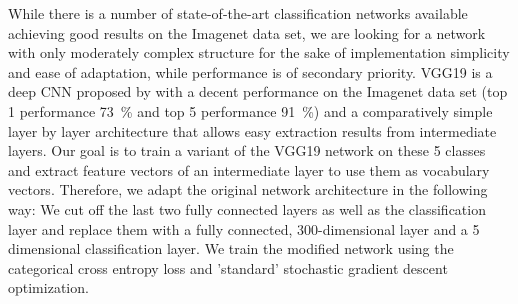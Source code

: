 While there is a number of state-of-the-art classification networks available achieving good results on the Imagenet data set, we are looking for a network with only moderately complex structure for the sake of implementation simplicity and ease of adaptation, while performance is of secondary priority.
VGG19 is a deep \acf{CNN} proposed by \textcite{Simonyan2014} with a decent performance on the Imagenet data set (top 1 performance \SI{73}{\percent} and top 5 performance \SI{91}{\percent}) and a comparatively simple layer by layer architecture that allows easy extraction results from intermediate layers.
Our goal is to train a variant of the VGG19 network on these \num{5} classes and extract feature vectors of an intermediate layer to use them as vocabulary vectors.
Therefore, we adapt the original network architecture in the following way:
We cut off the last two fully connected layers as well as the classification layer and replace them with a fully connected, \num{300}-dimensional layer and a \num{5} dimensional classification layer. 
We train the modified network using the categorical cross entropy loss and 'standard' stochastic gradient descent optimization.

